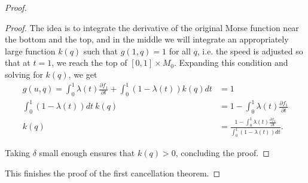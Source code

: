 \begin{proof}
\begin{proof}
    The idea is to integrate the derivative of the original Morse function near the bottom and the top, and in the middle we will integrate an appropriately large function $k(q)$ such that  $g(1, q) = 1$ for all $q$, i.e. the speed is adjusted so that at $t=1$, we reach the top of $[0,1] \times M_0$.
    Expanding this condition and solving for $k(q)$, we get
     \begin{align*}
         g(u, q) = \int_{0}^{1} \lambda(t) \frac{\partial f_1}{\partial t}  + \int_{0}^{1}  (1-\lambda(t)) k(q) dt &= 1\\
          \int_{0}^{1}  (1-\lambda(t))  dt \  k(q)&= 1 - \int_{0}^{1} \lambda(t) \frac{\partial f_1}{\partial t}\\
          k(q)&= \frac{1 - \int_{0}^{1} \lambda(t) \frac{\partial f_1}{\partial t}}{\int_{0}^{1}  (1-\lambda(t))  dt}
    .\end{align*} 

    Taking $\delta$ small enough ensures that  $k(q) > 0$, concluding the proof.
\end{proof}

This finishes the proof of the first cancellation theorem.

\renewcommand{\qedsymbol}{\ensuremath{\square}}
    
\end{proof}

\filbreak

